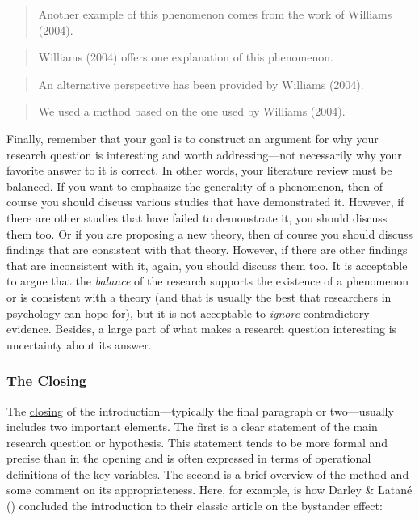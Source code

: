 \documentclass[
]{krantz}
\begin{document}
\begin{quote}
Another example of this phenomenon comes from the work of Williams (2004).
\end{quote}

\begin{quote}
Williams (2004) offers one explanation of this phenomenon.
\end{quote}

\begin{quote}
An alternative perspective has been provided by Williams (2004).
\end{quote}

\begin{quote}
We used a method based on the one used by Williams (2004).
\end{quote}

Finally, remember that your goal is to construct an argument for why your research question is interesting and worth addressing---not necessarily why your favorite answer to it is correct. In other words, your literature review must be balanced. If you want to emphasize the generality of a phenomenon, then of course you should discuss various studies that have demonstrated it. However, if there are other studies that have failed to demonstrate it, you should discuss them too. Or if you are proposing a new theory, then of course you should discuss findings that are consistent with that theory. However, if there are other findings that are inconsistent with it, again, you should discuss them too. It is acceptable to argue that the \emph{balance} of the research supports the existence of a phenomenon or is consistent with a theory (and that is usually the best that researchers in psychology can hope for), but it is not acceptable to \emph{ignore} contradictory evidence. Besides, a large part of what makes a research question interesting is uncertainty about its answer.

\subsubsection*{The Closing}\label{the-closing}


The \hyperref[closing]{closing} of the introduction---typically the final paragraph or two---usually includes two important elements. The first is a clear statement of the main research question or hypothesis. This statement tends to be more formal and precise than in the opening and is often expressed in terms of operational definitions of the key variables. The second is a brief overview of the method and some comment on its appropriateness. Here, for example, is how Darley \& Latané () concluded the introduction to their classic article on the bystander effect:
\end{document}

